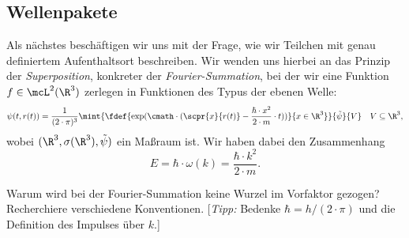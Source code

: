 \documentclass{article}
\begin{document}
    \subsection*{Wellenpakete}
        Als nächstes beschäftigen wir uns mit der Frage, wie wir Teilchen mit genau definiertem Aufenthaltsort beschreiben. Wir wenden uns hierbei an das Prinzip der \emph{Superposition}, konkreter der \emph{Fourier-Summation}, bei der wir eine Funktion $f\in \mcL^2(\R^3)$ zerlegen in Funktionen des Typus der ebenen Welle:
        \[\psi(t,r(t)) = \frac{1}{(2\cdot\pi)^3}\mint{\fdef{\exp(\cmath\cdot(\scpr{x}{r(t)} - \frac{\hbar\cdot x^2}{2\cdot m}\cdot t))}{x\in\R^3}}{\tilde\psi}{V}\quad V\subseteq\R^3,\]
        wobei $(\R^3,\sigma(\R^3),\tilde\psi)$ ein Maßraum ist. Wir haben dabei den Zusammenhang 
        \[E = \hbar\cdot\omega(k) = \frac{\hbar\cdot k^2}{2\cdot m}.\]

        \begin{Aufgabe}
            \nr{} Warum wird bei der Fourier-Summation keine Wurzel im Vorfaktor gezogen? Recherchiere verschiedene Konventionen. [\textit{Tipp:} Bedenke $\hbar = h/(2\cdot \pi)$ und die Definition des Impulses über $k$.]
        \end{Aufgabe}
\end{document}
